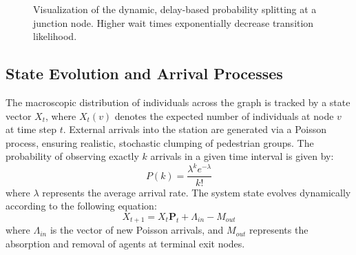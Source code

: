 \documentclass[conference]{IEEEtran}
\begin{document}
\begin{figure}[htbp]
\centering
{}
\caption{Visualization of the dynamic, delay-based probability splitting at a junction node. Higher wait times exponentially decrease transition likelihood.}
\label{fig:prob}
\end{figure}

\subsection{State Evolution and Arrival Processes}
The macroscopic distribution of individuals across the graph is tracked by a state vector $X_t$, where $X_t(v)$ denotes the expected number of individuals at node $v$ at time step $t$. External arrivals into the station are generated via a Poisson process, ensuring realistic, stochastic clumping of pedestrian groups. The probability of observing exactly $k$ arrivals in a given time interval is given by:
\begin{equation}
P(k) = \frac{\lambda^k e^{-\lambda}}{k!}
\end{equation}
where $\lambda$ represents the average arrival rate. The system state evolves dynamically according to the following equation:
\begin{equation}
X_{t+1} = X_t \mathbf{P}_t + \Lambda_{in} - M_{out}
\end{equation}
where $\Lambda_{in}$ is the vector of new Poisson arrivals, and $M_{out}$ represents the absorption and removal of agents at terminal exit nodes.
\end{document}
